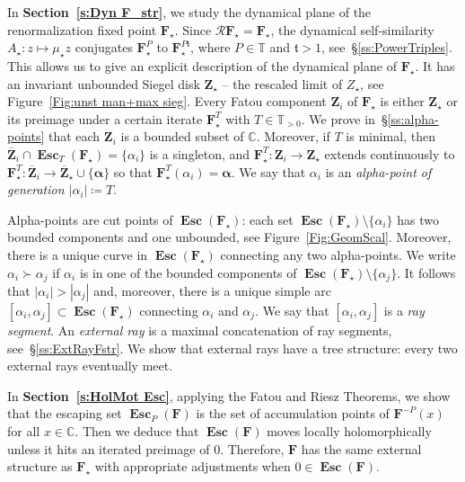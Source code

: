 \documentclass{amsart}
\newcommand{\1}{{\mathbb 1 }}
\newcommand\PT{\mathbb{ T}}
\newcommand\RR{\mathcal{R}}
\newcommand{\bF}{{\mathbf F}}
\newcommand{\bZ}{{\mathbf Z}}
\newcommand{\str}{{\star}}
\renewcommand{\tt}{\mathfrak{t}}
\newcommand{\C}{\mathbb{C}}
\theoremstyle{remark}
\numberwithin{equation}{section}
\theoremstyle{definition}
\newcommand{\Esc}{{\boldsymbol{\operatorname{Esc}}}}
\newcommand{\balpha}{{\boldsymbol \alpha}}
\theoremstyle{nonumberbreak}
\begin{document}
In {\bf Section~\ref{s:Dyn F_str}}, we study the dynamical plane of the renormalization fixed point $\bF_\str$.
Since $\RR\bF_\str= \bF_\str$, the dynamical self-similarity ${A_\str\colon z\mapsto \mu_\str z}$ conjugates $\bF_\str ^P$ to $\bF_\str^{P\tt}$, where $P\in \PT$ and $\tt>1$, see~\S\ref{ss:PowerTriples}. This allows us to give an explicit description of the dynamical plane of $\bF_\str$. It has an invariant unbounded Siegel disk $\bZ_\str$ -- the rescaled limit of $Z_\str$, see Figure~\ref{Fig:unst man+max sieg}. Every Fatou component $\bZ_i$ of $\bF_\str$ is either $\bZ_\str$ or its preimage under a certain iterate $\bF_\str^T$ with $T\in \PT_{>0}.$ We prove in~\S\ref{ss:alpha-points} that each $\bZ_i$ is a bounded subset of $\C$. Moreover, if $T$ is minimal, then $\overline \bZ_i\cap \Esc_T(\bF_\str)=\{\alpha_i\}$ is a singleton, and $\bF_\str^T\colon \bZ_i\to \bZ_\str$ extends continuously to $\bF_\str^T\colon \overline \bZ_i\to \overline \bZ_\str\cup \{\balpha\}$ so that $\bF_\str^T(\alpha_
i)=\balpha$. We say that $\alpha_i$ is an \emph{alpha-point of generation $|\alpha_i|\coloneqq T$}.

Alpha-points are cut points of $\Esc(\bF_\str)$: each set $\Esc(\bF_\str)\setminus \{\alpha_i\}$ has two bounded components and one unbounded, see Figure~\ref{Fig:GeomScal}. Moreover, there is a unique curve in $\Esc(\bF_\str)$ connecting any two alpha-points. We write $\alpha_i\succ\alpha_j$ if $\alpha_i$ is in one of the bounded components of $\Esc(\bF_\str)\setminus\{\alpha_j\}$. It follows that $|\alpha_i|> |\alpha_j|$ and, moreover, there is a unique simple arc $[\alpha_i,\alpha_j]\subset \Esc (\bF_\str)$ connecting $\alpha_i$ and $\alpha_j$. We say that $[\alpha_i,\alpha_j]$ is a \emph{ray segment}. An \emph{external ray} is a maximal concatenation of ray segments, see~\S\ref{ss:ExtRayFstr}. We show that external rays have a tree structure: every two external rays eventually meet. 


In {\bf Section~\ref{s:HolMot Esc}}, applying the Fatou and Riesz Theorems,  we show that the escaping set $\Esc_P(\bF)$ is the set of accumulation points of $\bF^{-P}(x)$ for all $x\in\C$. Then we deduce that $\Esc(\bF)$ moves locally holomorphically unless it hits an iterated preimage of $0$. Therefore, $\bF$ has the same external structure as $\bF_\str$ with appropriate adjustments when $0\in\Esc(\bF)$.
\end{document}
